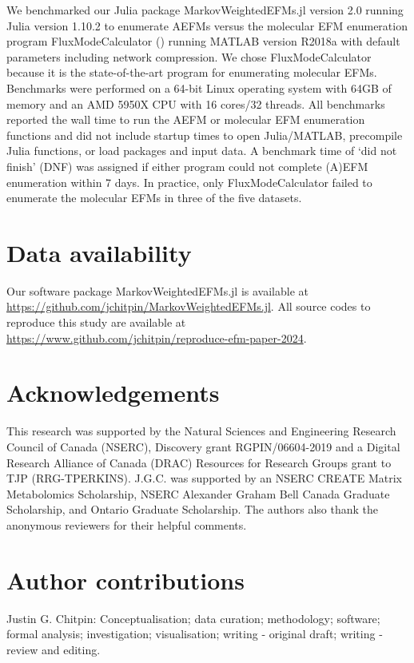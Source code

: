 \documentclass[12pt]{article}
\begin{document}
We benchmarked our Julia package MarkovWeightedEFMs.jl version 2.0
running Julia version 1.10.2 to enumerate
AEFMs versus the molecular EFM enumeration program FluxModeCalculator
(\cite{vanKlinkenJanBert2016Faet}) running MATLAB version R2018a with
default parameters including network compression. We chose
FluxModeCalculator because it is the state-of-the-art program for
enumerating molecular EFMs. Benchmarks were performed on a 64-bit Linux
operating system with 64GB of memory and an AMD 5950X CPU with 16 cores/32
threads. All benchmarks reported the wall time to run the AEFM or
molecular EFM enumeration functions and did not include startup times to
open Julia/MATLAB, precompile Julia functions, or load packages and input
data. A benchmark time of `did not finish' (DNF) was assigned if either
program could not complete (A)EFM enumeration within 7 days. In practice,
only FluxModeCalculator failed to enumerate the molecular EFMs in three of
the five datasets.


\section*{Data availability}

Our software package MarkovWeightedEFMs.jl is available at
\url{https://github.com/jchitpin/MarkovWeightedEFMs.jl}. All source codes
to reproduce this study are available at
\url{https://www.github.com/jchitpin/reproduce-efm-paper-2024}.

\section*{Acknowledgements}


%
This research was supported by the Natural Sciences and Engineering
Research Council of Canada (NSERC), Discovery grant RGPIN/06604-2019 and
a Digital Research Alliance of Canada (DRAC) Resources for Research Groups
grant to TJP (RRG-TPERKINS). J.G.C. was supported by an NSERC CREATE
Matrix Metabolomics Scholarship, NSERC Alexander Graham Bell Canada
Graduate Scholarship, and Ontario Graduate Scholarship.
The authors also thank the anonymous reviewers for their helpful comments.

\section*{Author contributions}

Justin G. Chitpin: Conceptualisation; data curation; methodology;
software; formal analysis; investigation; visualisation; writing
- original draft; writing - review and editing.\\
\end{document}

